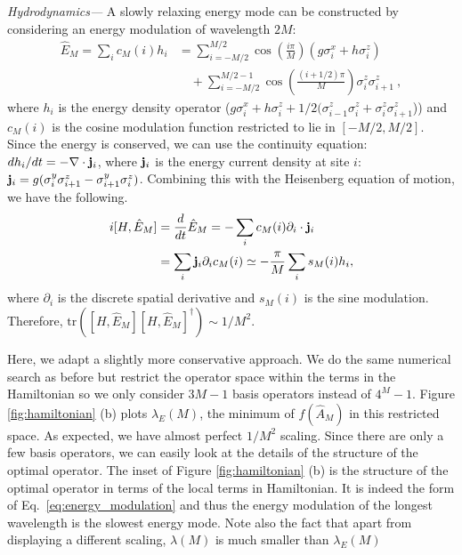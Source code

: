 \documentclass[twocolumn,superscriptaddress, prl,showpacs]{revtex4-1}
\begin{document}
{\it Hydrodynamics---}
A slowly relaxing energy mode can be constructed by considering an energy modulation of wavelength $2M$:
\begin{align}
\hat{E}_M = \sum_i c_M(i) h_i
&= \sum_{i=-M/2}^{M/2} \cos\left(\frac{i\pi}{M}\right)(g \sigma^x_i + h\sigma^z_i)\nonumber\\
&\quad+ \sum_{i=-M/2}^{M/2-1} \cos\left(\frac{(i+1/2)\pi}{M}\right)\sigma^z_i\sigma^z_{i+1} ~,
\label{eq:energy_modulation}
\end{align}
where $h_i$ is the energy density operator ($g \sigma^x_i + h\sigma^z_i + 1/2(\sigma^z_{i-1}\sigma^z_i + \sigma^z_i\sigma^z_{i+1}$))
and $c_M(i)$ is the cosine modulation function restricted to lie in $[-M/2,M/2]$.
Since the energy is conserved, we can use the continuity equation:
$d h_i/dt = -\nabla \cdot {\bf j}_i$, where ${\bf j}_i$ is the energy current density at site $i$:
${\bf j}_i = g(\sigma^y_i \sigma^z_{i+1} - \sigma^y_{i+1} \sigma^z_i)$.
Combining this with the Heisenberg equation of motion, we have the following.
\begin{align}
 i[H,\hat{E}_M] &= \frac{d}{dt} \hat{E}_M = -\sum_i c_M(i) \partial_i \cdot {\bf j}_i \\
 &= \sum_i {\bf j}_i \partial_i c_M(i) \simeq -\frac{\pi}{M} \sum_i s_M(i) h_i,
\end{align}
where $\partial_i$ is the discrete spatial derivative and $s_M(i)$ is the sine modulation.
Therefore, $\mathrm{tr}([H,\hat{E}_M][H,\hat{E}_M]^\dag) \sim 1/M^2$.

Here, we adapt a slightly more conservative approach.
We do the same numerical search as before but restrict the operator space within the terms in the Hamiltonian
so we only consider $3M-1$ basis operators instead of $4^M-1$.
Figure \ref{fig:hamiltonian} (b) plots $\lambda_E(M)$, the minimum of $f(\hat{A}_M)$ in this restricted space.
As expected, we have almost perfect $1/M^2$ scaling.
Since there are only a few basis operators, we can easily look at the details of the structure of the optimal operator.
The inset of Figure \ref{fig:hamiltonian} (b) is the structure of the optimal operator in terms of the local terms in Hamiltonian.
It is indeed the form of Eq.~\eqref{eq:energy_modulation} and thus the energy modulation of the longest wavelength is the slowest energy mode.
Note also the fact that apart from displaying a different scaling, $\lambda(M)$ is much smaller than $\lambda_E(M)$
\end{document}

